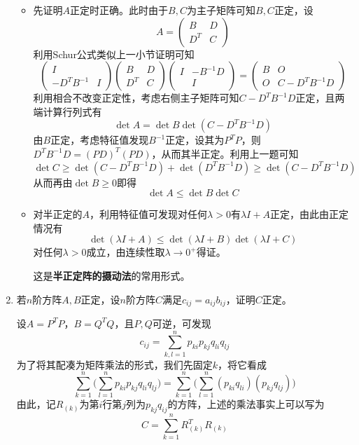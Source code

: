 \documentclass[a4paper,UTF8,fontset=windows]{ctexart}
\newcommand*{\note}{\noindent *}
\begin{document}
\begin{enumerate}
    \begin{itemize}
        \item 先证明$A$正定时正确。此时由于$B,C$为主子矩阵可知$B,C$正定，设
        $$A=\begin{pmatrix}B&D\\D^T&C\end{pmatrix}$$
        利用Schur公式类似上一小节证明可知
        $$\begin{pmatrix}I&\\-D^TB^{-1}&I\end{pmatrix}\begin{pmatrix}B&D\\D^T&C\end{pmatrix}\begin{pmatrix}I&-B^{-1}D\\ &I\end{pmatrix}=\begin{pmatrix}B&O\\O&C-D^TB^{-1}D\end{pmatrix}$$
        利用相合不改变正定性，考虑右侧主子矩阵可知$C-D^TB^{-1}D$正定，且两端计算行列式有
        $$\det A=\det B\det(C-D^TB^{-1}D)$$
        由$B$正定，考虑特征值发现$B^{-1}$正定，设其为$P^TP$，则$D^TB^{-1}D=(PD)^T(PD)$，从而其半正定。利用上一题可知
        $$\det C\ge\det(C-D^TB^{-1}D)+\det(D^TB^{-1}D)\ge\det(C-D^TB^{-1}D)$$
        从而再由$\det B\ge0$即得
        $$\det A\le\det B\det C$$
        \item 对半正定的$A$，利用特征值可发现对任何$\lambda>0$有$\lambda I+A$正定，由此由正定情况有
        $$\det(\lambda I+A)\le\det(\lambda I+B)\det(\lambda I+C)$$
        对任何$\lambda>0$成立，由连续性取$\lambda\to0^+$得证。
    
        \note 这是\textbf{半正定阵的摄动法}的常用形式。
    \end{itemize}

    \item 若$n$阶方阵$A,B$正定，设$n$阶方阵$C$满足$c_{ij}=a_{ij}b_{ij}$，证明$C$正定。
    
    设$A=P^TP$，$B=Q^TQ$，且$P,Q$可逆，可发现
    $$c_{ij}=\sum_{k,l=1}^np_{ki}p_{kj}q_{li}q_{lj}$$
    为了将其配凑为矩阵乘法的形式，我们先固定$k$，将它看成
    $$\sum_{k=1}^n\bigg(\sum_{l=1}^np_{ki}p_{kj}q_{li}q_{lj}\bigg)=\sum_{k=1}^n\bigg(\sum_{l=1}^n(p_{ki}q_{li})(p_{kj}q_{lj})\bigg)$$
    由此，记$R_{(k)}$为第$i$行第$j$列为$p_{kj}q_{ij}$的方阵，上述的乘法事实上可以写为
    $$C=\sum_{k=1}^nR_{(k)}^TR_{(k)}$$


\end{enumerate}
\end{document}
